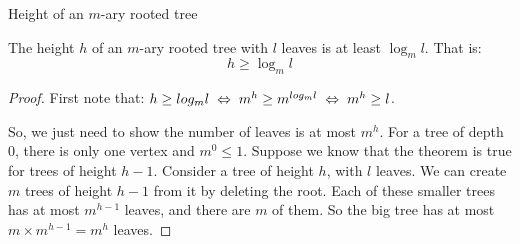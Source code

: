 \begin{frame}{Height of an $m$-ary rooted tree}
  
  \begin{theorem}
    The height $h$ of an $m$-ary rooted tree with $l$ leaves is at least $\log_m l$.
    That is:
    \[ h \geq \log_m l \]
  \end{theorem}
  
  \begin{proof}
    First note that: $h \geq log_m l \hspace{0.1cm} \Leftrightarrow \hspace{0.1cm} m^h \geq m^{log_m l} \hspace{0.1cm} \Leftrightarrow \hspace{0.1cm} m^h \geq l$.
    
    So, we just need to show the number of leaves is at most $m^h$.
    For a tree of depth 0, there is only one vertex and $m^0 \leq 1$.
    Suppose we know that the theorem is true for trees of height $h-1$.
    Consider a tree of height $h$, with $l$ leaves.
    We can create $m$ trees of height $h-1$ from it by deleting the root.
    Each of these smaller trees has at most $m^{h-1}$ leaves, and there are $m$ of them.
    So the big tree has at most $m \times m^{h-1} = m^h$ leaves.

  \end{proof}
  
\end{frame}

